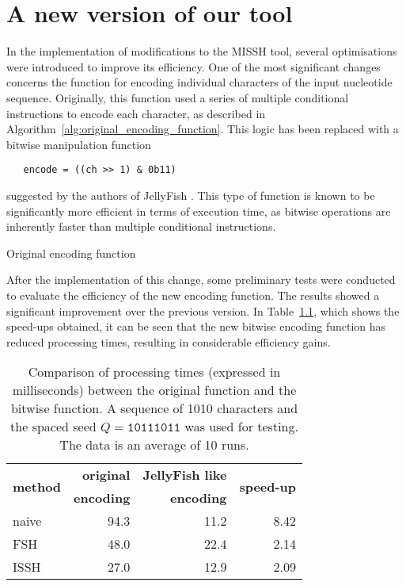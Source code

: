 \chapter{A new version of our tool}
\label{chp:develop}

In the implementation of modifications to the \acs{MISSH} tool, several optimisations were introduced to improve its efficiency. One of the most significant changes concerns the function for encoding individual characters of the input nucleotide sequence. Originally, this function used a series of multiple conditional instructions to encode each character, as described in Algorithm~\ref{alg:original_encoding_function}. This logic has been replaced with a bitwise manipulation function
\begin{verbatim}
   encode = ((ch >> 1) & 0b11)
\end{verbatim}
suggested by the authors of JellyFish \cite{marcais2011jellyfish}. This type of function is known to be significantly more efficient in terms of execution time, as bitwise operations are inherently faster than multiple conditional instructions.

\begin{algorithm}[!ht]
	\caption{Original encoding function}
	\label{alg:original_encoding_function}
	
\end{algorithm}

After the implementation of this change, some preliminary tests were conducted to evaluate the efficiency of the new encoding function. The results showed a significant improvement over the previous version. In Table~\ref{tab:encodingFunctionSpeedup}, which shows the speed-ups obtained, it can be seen that the new bitwise encoding function has reduced processing times, resulting in considerable efficiency gains.

\begin{table}[!ht]
	\centering
	\begin{tabular}{l rr r}
		\multirow{2}{*}{\textbf{method}} & \textbf{original} & \textbf{JellyFish like} & \multirow{2}{*}{\textbf{speed-up}} \\
		& \textbf{encoding} & \textbf{encoding} & \\
		\toprule
		naive & 94.3 & 11.2 & 8.42 \\
		FSH & 48.0 & 22.4 & 2.14 \\
		ISSH & 27.0 & 12.9 & 2.09 \\
		\bottomrule
	\end{tabular}
	\caption[Comparison of processing times between the original function and the bitwise function.]{Comparison of processing times (expressed in milliseconds) between the original function and the bitwise function. A sequence of 1010 characters and the spaced seed $Q = \texttt{10111011}$ was used for testing. The data is an average of 10 runs.}
	\label{tab:encodingFunctionSpeedup}
\end{table}

